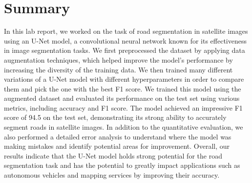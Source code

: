 \documentclass[10pt,conference,compsocconf]{IEEEtran}
\begin{document}
\section{Summary}
In this lab report, we worked on the task of road segmentation in satellite images using an U-Net model, a convolutional neural network known for its effectiveness in image segmentation tasks. We first preprocessed the dataset by applying data augmentation techniques, which helped improve the model's performance by increasing the diversity of the training data. We then trained many different variations of a U-Net model with different hyperparameters in order to compare them and pick the one with the best F1 score. We trained this model using the augmented dataset and evaluated its performance on the test set using various metrics, including accuracy and F1 score. The model achieved an impressive F1 score of 94.5 on the test set, demonstrating its strong ability to accurately segment roads in satellite images. In addition to the quantitative evaluation, we also performed a detailed error analysis to understand where the model was making mistakes and identify potential areas for improvement. Overall, our results indicate that the U-Net model holds strong potential for the road segmentation task and has the potential to greatly impact applications such as autonomous vehicles and mapping services by improving their accuracy.



\end{document}
